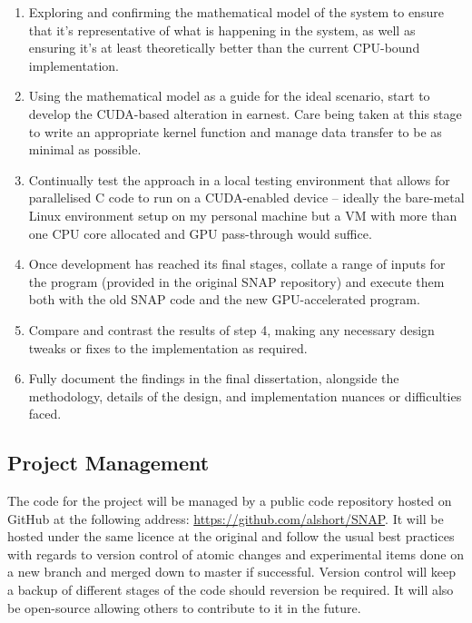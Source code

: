 \documentclass[conference]{IEEEtran}
\begin{document}
\begin{enumerate}

\item Exploring and confirming the mathematical model of the system to ensure that it’s representative of what is happening in the system, as well as ensuring it’s at least theoretically better than the current CPU-bound implementation.

\item Using the mathematical model as a guide for the ideal scenario, start to develop the CUDA-based alteration in earnest. Care being taken at this stage to write an appropriate kernel function and manage data transfer to be as minimal as possible.

\item Continually test the approach in a local testing environment that allows for parallelised C code to run on a CUDA-enabled device – ideally the bare-metal Linux environment setup on my personal machine but a VM with more than one CPU core allocated and GPU pass-through would suffice.

\item Once development has reached its final stages, collate a range of inputs for the program (provided in the original SNAP repository) and execute them both with the old SNAP code and the new GPU-accelerated program.

\item Compare and contrast the results of step 4, making any necessary design tweaks or fixes to the implementation as required.

\item Fully document the findings in the final dissertation, alongside the methodology, details of the design, and implementation nuances or difficulties faced.

\end{enumerate}


\subsection{Project Management}

The code for the project will be managed by a public code repository hosted on GitHub at the following address: \url{https://github.com/alshort/SNAP}. It will be hosted under the same licence at the original and follow the usual best practices with regards to version control of atomic changes and experimental items done on a new branch and merged down to master if successful. Version control will keep a backup of different stages of the code should reversion be required. It will also be open-source allowing others to contribute to it in the future.
\end{document}

